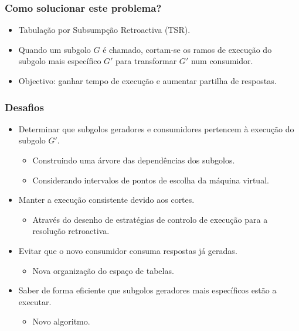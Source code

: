 \documentclass{beamer}
\begin{document}
\begin{frame}
   \frametitle{Como solucionar este problema?}
   \begin{itemize}
      \item Tabulação por Subsumpção Retroactiva (TSR).
      \pause
      \item Quando um subgolo $G$ é chamado, cortam-se os ramos de execução do subgolo mais
      específico $G'$ para transformar $G'$ num consumidor.
      \pause
      \item Objectivo: ganhar tempo de execução e aumentar partilha de respostas.
   \end{itemize}
\end{frame}

\begin{frame}
   \frametitle{Desafios}
   \begin{itemize}
      \item Determinar que subgolos geradores e consumidores pertencem à execução do subgolo $G'$.
      \begin{itemize}
         \pause
         \item Construindo uma árvore das dependências dos subgolos.
         \pause
         \item Considerando intervalos de pontos de escolha da máquina virtual.
      \end{itemize}
      \pause
      \item Manter a execução consistente devido aos cortes.
      \begin{itemize}
         \pause
         \item Através do desenho de estratégias de controlo de execução para a resolução retroactiva.
      \end{itemize}
      \pause
      \item Evitar que o novo consumidor consuma respostas já geradas.
      \begin{itemize}
         \pause
         \item Nova organização do espaço de tabelas.
      \end{itemize}
      \pause
      \item Saber de forma eficiente que subgolos geradores mais específicos estão a executar.
      \begin{itemize}
         \pause
         \item Novo algoritmo.
      \end{itemize}
   \end{itemize}
\end{frame}
\end{document}
